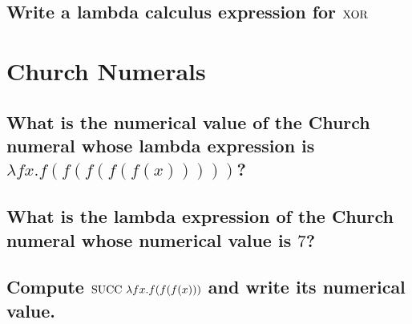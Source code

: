 		\subsection{Write a lambda calculus expression for $\mathrm{XOR}$}
		\solutionspace{1in}
	\section{Church Numerals}
		\subsection{What is the numerical value of the Church numeral whose lambda expression is $\lambda fx.f (f(f(f(f(x)))))$?}
		\solutionspace{1ex}
		\subsection{What is the lambda expression of the Church numeral whose numerical value is $7$?}
		\solutionspace{1ex}
		\subsection{Compute $\mathrm{SUCC}\ \lambda fx.f(f(f(x)))$ and write its numerical value.}

